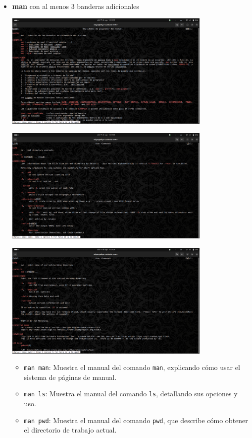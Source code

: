 \begin{itemize}
    
    \item \textbf{man} con al menos 3 banderas adicionales
    \begin{center}
        \includegraphics[width=10cm]{IMAGE/man-man.png}
    \end{center}
    \begin{center}
        \includegraphics[width=10cm]{IMAGE/man-ls.png}
    \end{center}
    \begin{center}
        \includegraphics[width=10cm]{IMAGE/man-pwd.png}
    \end{center}
    \begin{itemize}
        \item \texttt{man man}: Muestra el manual del comando \texttt{man}, explicando cómo usar el sistema de páginas de manual.
        \item \texttt{man ls}: Muestra el manual del comando \texttt{ls}, detallando sus opciones y uso.
        \item \texttt{man pwd}: Muestra el manual del comando \texttt{pwd}, que describe cómo obtener el directorio de trabajo actual.
    \end{itemize}


\end{itemize}
